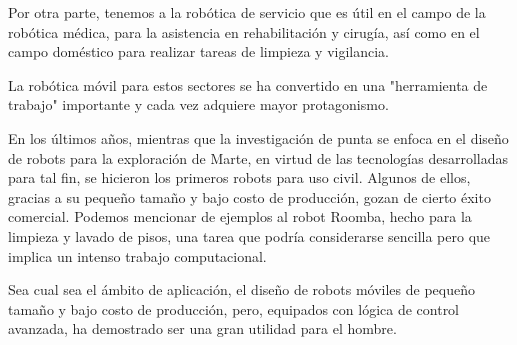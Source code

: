 Por otra parte, tenemos a la robótica de servicio que es útil en el campo de la robótica médica, para la asistencia en rehabilitación y cirugía, así como en el campo doméstico para realizar tareas de limpieza y vigilancia.

La robótica móvil para estos sectores se ha convertido en una "herramienta de trabajo" importante y cada vez adquiere mayor protagonismo.

En los últimos años, mientras que la investigación de punta se enfoca en el diseño de robots para la exploración de Marte, en virtud de las tecnologías desarrolladas para tal fin, se hicieron los primeros robots para uso civil. Algunos de ellos, gracias a su pequeño tamaño y bajo costo de producción, gozan de cierto éxito comercial. Podemos mencionar de ejemplos al robot Roomba, hecho para la limpieza y lavado de pisos, una tarea que podría considerarse sencilla pero que implica un intenso trabajo computacional.

Sea cual sea el ámbito de aplicación, el diseño de robots móviles de pequeño tamaño y bajo costo de producción, pero, equipados con lógica de control avanzada, ha demostrado ser una gran utilidad para el hombre.